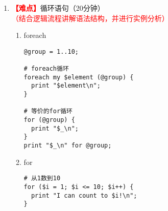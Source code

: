 \documentclass{TIJMUjiaoanLL}
\begin{document}
\begin{enumerate}
\begin{enumerate}
\begin{multicols}{2}
\begin{verbatim}
# given-when
use 5.010;
given ($foo) {
  say "a" when "a";
  when (/b/) {say "b";}
  default {say "not match";}
}
\end{verbatim}
\end{multicols}
\vspace*{-25pt}
      \item given-when
    \vspace*{-10pt}
    \begin{figure}[h]
      \centering
      \texttt{[image: c9\_perl\_unless\_01.png]}
      \qquad \qquad
      \texttt{[image: c9\_perl\_given\_01.png]}
    \end{figure}
    \vspace*{-10pt}

    \end{enumerate}


\otherTail
\newpage
\otherHeader


  \item \textcolor{red}{\textbf{【难点】}}循环语句（20分钟）\textcolor{red}{（结合逻辑流程讲解语法结构，并进行实例分析）}
    \begin{enumerate}
      \item foreach
\vspace*{-15pt}
\begin{figure}[h]
\end{figure}
\vspace*{-13pt}
\begin{verbatim}
@group = 1..10;

# foreach循环
foreach my $element (@group) {
  print "$element\n";
}

# 等价的for循环
for (@group) {
  print "$_\n";
}
print "$_\n" for @group;
\end{verbatim}
\vspace*{-5pt}

      \item for
\vspace*{-15pt}
\begin{figure}[h]
\end{figure}
\vspace*{-13pt}
\begin{verbatim}
# 从1数到10
for ($i = 1; $i <= 10; $i++) {
  print "I can count to $i!\n";
}
\end{verbatim}
\vspace*{-5pt}


\end{enumerate}
\end{enumerate}
\end{document}
